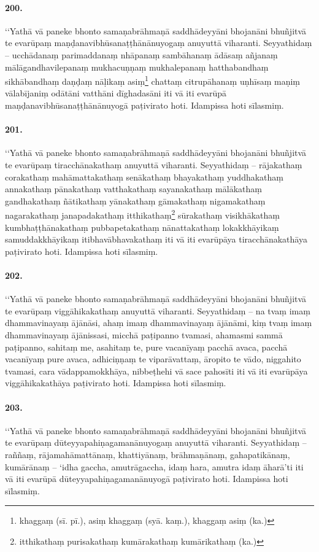 \paragraph{200.} ‘‘Yathā vā paneke bhonto samaṇabrāhmaṇā saddhādeyyāni bhojanāni bhuñjitvā te evarūpaṃ maṇḍanavibhūsanaṭṭhānānuyogaṃ anuyuttā viharanti. Seyyathidaṃ – ucchādanaṃ parimaddanaṃ nhāpanaṃ sambāhanaṃ ādāsaṃ añjanaṃ mālāgandhavilepanaṃ mukhacuṇṇaṃ mukhalepanaṃ hatthabandhaṃ sikhābandhaṃ daṇḍaṃ nāḷikaṃ asiṃ\footnote{khaggaṃ (sī. pī.), asiṃ khaggaṃ (syā. kaṃ.), khaggaṃ asiṃ (ka.)} chattaṃ citrupāhanaṃ uṇhīsaṃ maṇiṃ vālabījaniṃ odātāni vatthāni dīghadasāni iti vā iti evarūpā maṇḍanavibhūsanaṭṭhānānuyogā paṭivirato hoti. Idampissa hoti sīlasmiṃ.

\paragraph{201.} ‘‘Yathā vā paneke bhonto samaṇabrāhmaṇā saddhādeyyāni bhojanāni bhuñjitvā te evarūpaṃ tiracchānakathaṃ anuyuttā viharanti. Seyyathidaṃ – rājakathaṃ corakathaṃ mahāmattakathaṃ senākathaṃ bhayakathaṃ yuddhakathaṃ annakathaṃ pānakathaṃ vatthakathaṃ sayanakathaṃ mālākathaṃ gandhakathaṃ ñātikathaṃ yānakathaṃ gāmakathaṃ nigamakathaṃ nagarakathaṃ janapadakathaṃ itthikathaṃ\footnote{itthikathaṃ purisakathaṃ kumārakathaṃ kumārikathaṃ (ka.)} sūrakathaṃ visikhākathaṃ kumbhaṭṭhānakathaṃ pubbapetakathaṃ nānattakathaṃ lokakkhāyikaṃ samuddakkhāyikaṃ itibhavābhavakathaṃ iti vā iti evarūpāya tiracchānakathāya paṭivirato hoti. Idampissa hoti sīlasmiṃ.

\paragraph{202.} ‘‘Yathā vā paneke bhonto samaṇabrāhmaṇā saddhādeyyāni bhojanāni bhuñjitvā te evarūpaṃ viggāhikakathaṃ anuyuttā viharanti. Seyyathidaṃ – na tvaṃ imaṃ dhammavinayaṃ ājānāsi, ahaṃ imaṃ dhammavinayaṃ ājānāmi, kiṃ tvaṃ imaṃ dhammavinayaṃ ājānissasi, micchā paṭipanno tvamasi, ahamasmi sammā paṭipanno, sahitaṃ me, asahitaṃ te, pure vacanīyaṃ pacchā avaca, pacchā vacanīyaṃ pure avaca, adhiciṇṇaṃ te viparāvattaṃ, āropito te vādo, niggahito tvamasi, cara vādappamokkhāya, nibbeṭhehi vā sace pahosīti iti vā iti evarūpāya viggāhikakathāya paṭivirato hoti. Idampissa hoti sīlasmiṃ.

\paragraph{203.} ‘‘Yathā vā paneke bhonto samaṇabrāhmaṇā saddhādeyyāni bhojanāni bhuñjitvā te evarūpaṃ dūteyyapahiṇagamanānuyogaṃ anuyuttā viharanti. Seyyathidaṃ – raññaṃ, rājamahāmattānaṃ, khattiyānaṃ, brāhmaṇānaṃ, gahapatikānaṃ, kumārānaṃ – ‘idha gaccha, amutrāgaccha, idaṃ hara, amutra idaṃ āharā’ti iti vā iti evarūpā dūteyyapahiṇagamanānuyogā paṭivirato hoti. Idampissa hoti sīlasmiṃ.

